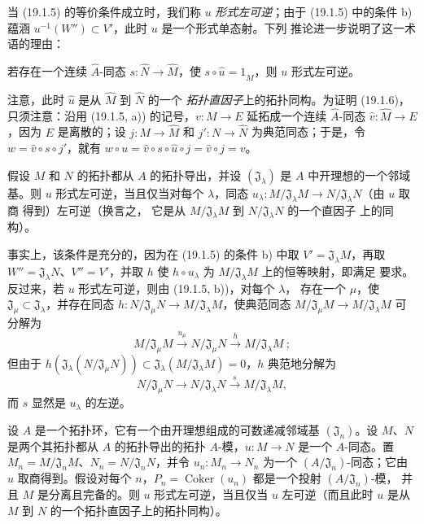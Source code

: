 当 (19.1.5) 的等价条件成立时，我们称 $u$ \emph{形式左可逆}；由于 (19.1.5)
中的条件 b) 蕴涵 $u^{-1}(W'')\subset V'$，此时 $u$ 是一个形式单态射。下列
推论进一步说明了这一术语的理由：

\begin{corollary}[19.1.6]
\label{0.19.1.6-fr}
若存在一个连续 $\widehat A$-同态 $s:\widehat N\to\widehat M$，使
$s\circ\widehat u=1_{\widehat M}$，则 $u$ 形式左可逆。
\end{corollary}

注意，此时 $\widehat u$ 是从 $\widehat M$ 到 $\widehat N$ 的一个
\emph{拓扑直因子}上的拓扑同构。为证明 (19.1.6)，只须注意：沿用
(19.1.5, a)) 的记号，$v:M\to E$ 延拓成一个连续 $\widehat A$-同态
$\widehat v:\widehat M\to E$，因为 $E$ 是离散的；设
$j:M\to\widehat M$ 和 $j':N\to\widehat N$ 为典范同态；于是，令
$w=\widehat v\circ s\circ j'$，就有
$w\circ u=\widehat v\circ s\circ\widehat u\circ j=\widehat v\circ j=v$。

\begin{corollary}[19.1.7]
\label{0.19.1.7-fr}
假设 $M$ 和 $N$ 的拓扑都从 $A$ 的拓扑导出，并设 $(\mathfrak J_\lambda)$ 是
$A$ 中开理想的一个邻域基。则 $u$ 形式左可逆，当且仅当对每个 $\lambda$，同态
$u_\lambda:M/\mathfrak J_\lambda M\to N/\mathfrak J_\lambda N$（由 $u$ 取商
得到）左可逆（换言之，
它是从 $M/\mathfrak J_\lambda M$ 到 $N/\mathfrak J_\lambda N$ 的一个直因子
上的同构）。
\end{corollary}

事实上，该条件是充分的，因为在 (19.1.5) 的条件 b) 中取
$V'=\mathfrak J_\lambda M$，再取 $W''=\mathfrak J_\lambda N$、$V''=V'$，并取
$h$ 使 $h\circ u_\lambda$ 为 $M/\mathfrak J_\lambda M$ 上的恒等映射，即满足
要求。反过来，若 $u$ 形式左可逆，则由 (19.1.5, b))，对每个 $\lambda$，
存在一个 $\mu$，使 $\mathfrak J_\mu\subset\mathfrak J_\lambda$，并存在同态
$h:N/\mathfrak J_\mu N\to M/\mathfrak J_\lambda M$，使典范同态
$M/\mathfrak J_\mu M\to M/\mathfrak J_\lambda M$ 可分解为
\[
  M/\mathfrak J_\mu M\xrightarrow{u_\mu}N/\mathfrak J_\mu N
  \xrightarrow{h}M/\mathfrak J_\lambda M~;
\]
但由于
$h(\mathfrak J_\lambda(N/\mathfrak J_\mu N))
\subset\mathfrak J_\lambda(M/\mathfrak J_\lambda M)=0$，$h$ 典范地分解为
\[
  N/\mathfrak J_\mu N\longrightarrow N/\mathfrak J_\lambda N
  \xrightarrow{s}M/\mathfrak J_\lambda M,
\]
而 $s$ 显然是 $u_\lambda$ 的左逆。

\begin{proposition}[19.1.8]
\label{0.19.1.8-fr}
设 $A$ 是一个拓扑环，它有一个由开理想组成的可数递减邻域基
$(\mathfrak J_n)$。设 $M$、$N$ 是两个其拓扑都从 $A$ 的拓扑导出的拓扑
$A$-模，$u:M\to N$ 是一个 $A$-同态。置
$M_n=M/\mathfrak J_nM$、$N_n=N/\mathfrak J_nN$，并令
$u_n:M_n\to N_n$ 为一个 $(A/\mathfrak J_n)$-同态；它由 $u$ 取商得到。假设对每个
$n$，$P_n=\operatorname{Coker}(u_n)$ 都是一个投射 $(A/\mathfrak J_n)$-模，
并且 $M$ 是分离且完备的。则 $u$ 形式左可逆，当且仅当 $u$ 左可逆（而且此时
$u$ 是从 $M$ 到 $N$ 的一个拓扑直因子上的拓扑同构）。
\end{proposition}

